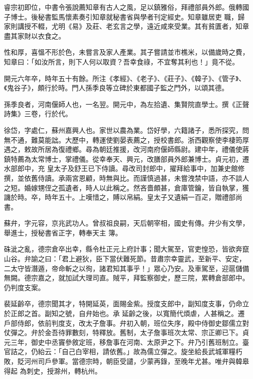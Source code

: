 \begin{pinyinscope}
 睿宗初即位，中書令張說薦知章有古人之風，足以鎮雅俗，拜禮部員外郎。俄轉國子博士。後秘書監馬懷素奏引知章就秘書省與學者刊定經史。知章雖居吏
 職，歸家則講授不輟，尤明《易》及莊、老玄言之學，遠近咸來受業。其有貧匱者，知章盡其家財以衣食之。



 性和厚，喜慍不形於色，未嘗言及家人產業。其子嘗請並市樵米，以備歲時之費，知章曰：「如汝所言，則下人何以取資？吾幸食祿，不宜奪其利也！」竟不從。



 開元六年卒，時年五十有餘。所注《孝經》、《老子》、《莊子》、《韓子》、《管子》、《鬼谷子》，頗行於時。門人孫季良等立碑於東都國子監之門外，以頌其德。



 孫季良者，河南偃師人也，一名翌。開元中，為左拾遺、集賢院直學士。撰《正聲詩集》三卷，行於代。



 徐岱，字處仁，蘇州嘉興人也。家世以農為業。岱好學，六籍諸子，悉所探究，問無不通，難莫能詘。大歷中，轉運使劉晏表薦之，授校書郎。浙西觀察使李棲筠厚遇之，敕故所居為復禮鄉。尋為朝廷推援，改河南府偃師縣尉。建中年，禮儀使蔣鎮特薦為太常博士，掌禮儀。從幸奉天、興元，改膳部員外郎兼博士。貞元初，遷水部郎中，充
 皇太子及舒王已下侍讀。尋改司封郎中，擢拜給事中，加兼史館修撰，並依舊侍讀。承兩宮恩顧，時無與比。而謹慎過甚，未嘗洩禁中語，亦不談人之短。婚嫁甥侄之孤遺者，時人以此稱之。然吝嗇頗甚，倉庫管鑰，皆自執掌，獲譏於時。卒，時年五十。上嘆惜之，賻以帛絹。皇太子又遺絹一百疋，贈禮部尚書。



 蘇弁，字元容，京兆武功人。曾叔祖良嗣，天后朝宰相，國史有傳。弁少有文學，舉進士，授秘書省正字，轉奉天主
 簿。



 硃泚之亂，德宗倉卒出幸，縣令杜正元上府計事；聞大駕至，官吏惶恐，皆欲奔竄山谷。弁諭之曰：「君上避狄，臣下當伏難死節。昔肅宗幸靈武，至新平、安定，二太守皆潛遁，帝命斬之以徇，諸君知其事乎！」眾心乃安。及車駕至，迎扈儲備無闕。德宗嘉之，就加試大理司直。賊平，拜監察御史，歷三院，累轉倉部郎中。仍判度支案。



 裴延齡卒，德宗聞其才，特開延英，面賜金紫。授度支郎中，副知度支事，仍命立於正郎之首。副知之號，自弁始也。承
 延齡之後，以寬簡代煩虐，人甚稱之。遷戶部侍郎，依前判度支，改太子詹事。弁初入朝，班位失序，殿中侍御史鄒儒立對仗彈之。弁於金吾待罪數刻，特釋放。舊制，太子詹事班次太常、宗正卿已下。貞元三年，御史中丞竇參敘定班，移詹事在河南、太原尹之下。弁乃引舊班制立。臺官詰之，仍紿云：「自己白宰相，請依舊。」故為儒立彈之。旋坐給長武城軍糧朽敗，貶河州司戶參軍。當德宗時，朝臣受譴，少蒙再錄，至晚年尤甚。唯弁與韓皋得起
 為刺史，授滁州，轉杭州。




\end{pinyinscope}
